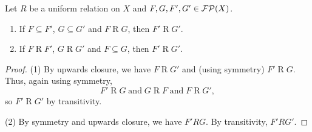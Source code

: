 \begin{lemma} \label{uniformRelationUpwardsClosure}
Let $R$ be a uniform relation on $X$ and $F,G, F', G'\in\operatorname{\mathcal{FP}}(X)$.
\begin{enumerate}
\item If $F \subseteq F'$, $G\subseteq G'$ and $F\mathrel{R} G$, then $F'\mathrel{R} G'$.
\item If $F \mathrel{R} F'$, $G\mathrel{R} G'$ and $F\subseteq G$, then $F'\mathrel{R} G'$.
\end{enumerate}
\end{lemma}
\begin{proof}
(1) By upwards closure, we have $F\mathrel{R} G'$ and  (using symmetry) $F'\mathrel{R} G$. Thus, again using symmetry,
\[ F'\mathrel{R} G \;\text{and}\; G \mathrel{R} F \;\text{and}\; F \mathrel{R} G', \]
so $F'\mathrel{R} G'$ by transitivity.

(2) By symmetry and upwards closure, we have $F'RG$. By transitivity, $F'RG'$.
\end{proof}

